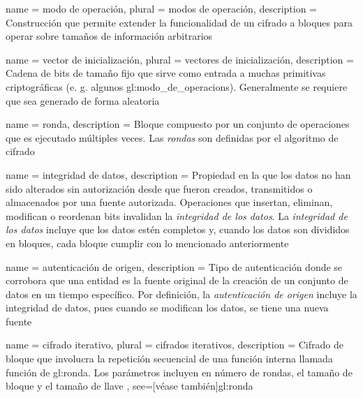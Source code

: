%
%
%

\makeglossaries

{
  name = modo de operación,
  plural = modos de operación,
  description = {
    Construcción que permite extender la funcionalidad de un cifrado a bloques
    para operar sobre tamaños de información arbitrarios%
  }
}

{
  name = vector de inicialización,
  plural = vectores de inicialización,
  description = {
    Cadena de bits de tamaño fijo que sirve como entrada a muchas primitivas
    criptográficas (e. g. algunos \glspl{gl:modo_de_operacion}). Generalmente
    se requiere que sea generado de forma aleatoria%
  }
}

{
  name = ronda,
  description = {
    Bloque compuesto por un conjunto de operaciones que es ejecutado
    múltiples veces. Las \textit{rondas} son definidas por el algoritmo de
    cifrado%
  }
}

{
  name = integridad de datos,
  description = {
    Propiedad en la que los datos no han sido alterados sin autorización desde
    que fueron creados, transmitidos o almacenados por una fuente autorizada.
    Operaciones que insertan, eliminan, modifican o reordenan bits invalidan
    la \textit{integridad de los datos}. La \textit{integridad de los datos}
    incluye que los datos estén completos y, cuando los datos son divididos en
    bloques, cada bloque cumplir con lo mencionado anteriormente%
  }
}

{
  name = autenticación de origen,
  description = {
    Tipo de autenticación donde se corrobora que una entidad es la fuente
    original de la creación de un conjunto de datos en un tiempo específico.
    Por definición, la \textit{autenticación de origen} incluye la integridad
    de datos, pues cuando se modifican los datos, se tiene una nueva fuente%
  }
}

{
  name = cifrado iterativo,
  plural = cifrados iterativos,
  description = {
    Cifrado de bloque que involucra la repetición secuencial de
    una función interna llamada función de \gls{gl:ronda}. Los
    parámetros incluyen en número de rondas, el tamaño de bloque y
    el tamaño de llave%
  },
  see=[véase también]{gl:ronda}
}

